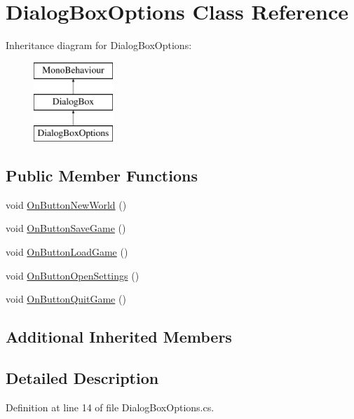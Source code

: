 \hypertarget{class_dialog_box_options}{}\section{Dialog\+Box\+Options Class Reference}
\label{class_dialog_box_options}
Inheritance diagram for Dialog\+Box\+Options\+:\begin{figure}[H]
\begin{center}
\leavevmode
\includegraphics[height=3.000000cm]{class_dialog_box_options}
\end{center}
\end{figure}
\subsection*{Public Member Functions}
\begin{DoxyCompactItemize}
\item 
void \hyperlink{class_dialog_box_options_a1b2b1a7e91b94e450e77878c5d5bb4b9}{On\+Button\+New\+World} ()
\item 
void \hyperlink{class_dialog_box_options_ae4b55c39f8177625ca69e08b490ecea3}{On\+Button\+Save\+Game} ()
\item 
void \hyperlink{class_dialog_box_options_a8ceee705b2bf35aa7c129bad0b9845ba}{On\+Button\+Load\+Game} ()
\item 
void \hyperlink{class_dialog_box_options_a624d922ed43edb8150be5e9a6ee2d374}{On\+Button\+Open\+Settings} ()
\item 
void \hyperlink{class_dialog_box_options_aee33fe855a444d8e336beafb716df107}{On\+Button\+Quit\+Game} ()
\end{DoxyCompactItemize}
\subsection*{Additional Inherited Members}


\subsection{Detailed Description}


Definition at line 14 of file Dialog\+Box\+Options.\+cs.




